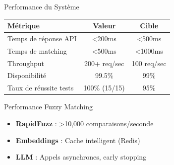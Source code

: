 \documentclass[aspectratio=169]{beamer}
\begin{document}
\begin{frame}{Performance du Système}
    \begin{table}
        \begin{tabular}{lcc}
            \toprule
            \textbf{Métrique} & \textbf{Valeur} & \textbf{Cible} \\
            \midrule
            Temps de réponse API & <200ms & <500ms \\
            Temps de matching & <500ms & <1000ms \\
            Throughput & 200+ req/sec & 100 req/sec \\
            Disponibilité & 99.5\% & 99\% \\
            Taux de réussite tests & 100\% (15/15) & 95\% \\
            \bottomrule
        \end{tabular}
    \end{table}

    \vspace{0.5cm}

    \begin{exampleblock}{Performance Fuzzy Matching}
        \begin{itemize}
            \item \textbf{RapidFuzz} : >10,000 comparaisons/seconde
            \item \textbf{Embeddings} : Cache intelligent (Redis)
            \item \textbf{LLM} : Appels asynchrones, early stopping
        \end{itemize}
    \end{exampleblock}
\end{frame}
\end{document}
